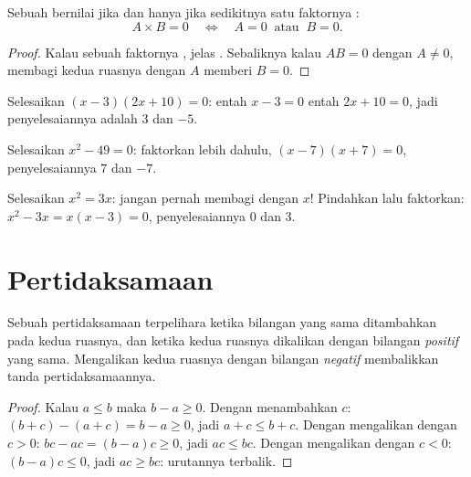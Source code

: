 \begin{theorem}\label{thm:g9:algebra:zeroproduct}
Sebuah  bernilai  jika dan hanya jika sedikitnya satu
faktornya :
\[
A \times B = 0
\quad\Longleftrightarrow\quad
A = 0 \ \text{ atau } \ B = 0 .
\]
\end{theorem}

\begin{proof}
Kalau sebuah faktornya , jelas  . Sebaliknya kalau
$A B = 0$ dengan $A \neq 0$, membagi kedua ruasnya dengan $A$ memberi
$B = 0$.
\end{proof}

\begin{example}\label{ex:g9:algebra:zeroproduct}
Selesaikan $(x - 3)(2x + 10) = 0$: entah $x - 3 = 0$ entah
$2x + 10 = 0$, jadi penyelesaiannya adalah $3$ dan $-5$.

Selesaikan $x^2 - 49 = 0$: faktorkan lebih dahulu, $(x-7)(x+7) = 0$,
penyelesaiannya $7$ dan $-7$.

Selesaikan $x^2 = 3x$: jangan pernah membagi dengan $x$! Pindahkan
lalu faktorkan: $x^2 - 3x = x(x - 3) = 0$, penyelesaiannya $0$ dan $3$.
\end{example}

\section{Pertidaksamaan}

\begin{proposition}\label{prop:g9:algebra:ineq}
Sebuah pertidaksamaan terpelihara ketika bilangan yang sama
ditambahkan pada kedua ruasnya, dan ketika kedua ruasnya dikalikan
dengan bilangan \emph{positif} yang sama. Mengalikan kedua ruasnya
dengan bilangan \emph{negatif} membalikkan tanda
pertidaksamaannya.
\end{proposition}

\begin{proof}
Kalau $a \leq b$ maka $b - a \geq 0$. Dengan menambahkan $c$:
$(b+c) - (a+c) = b - a \geq 0$, jadi $a + c \leq b + c$. Dengan
mengalikan dengan $c > 0$: $bc - ac = (b-a)c \geq 0$, jadi
$ac \leq bc$. Dengan mengalikan dengan $c < 0$:
$(b-a)c \leq 0$, jadi $ac \geq bc$: urutannya terbalik.
\end{proof}

